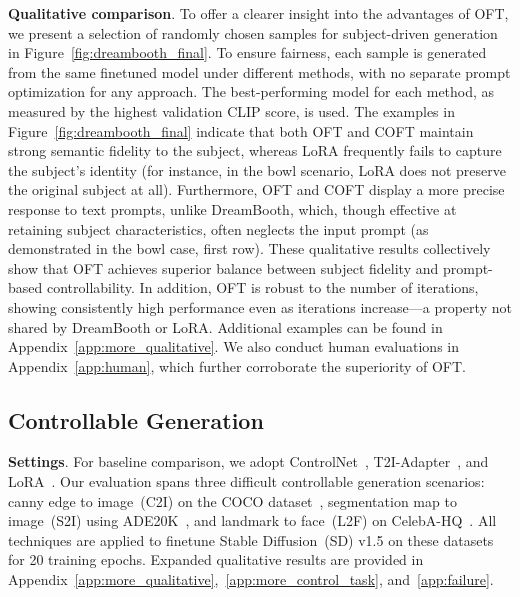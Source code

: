 \textbf{Qualitative comparison}. To offer a clearer insight into the advantages of OFT, we present a selection of randomly chosen samples for subject-driven generation in Figure~\ref{fig:dreambooth_final}. To ensure fairness, each sample is generated from the same finetuned model under different methods, with no separate prompt optimization for any approach. The best-performing model for each method, as measured by the highest validation CLIP score, is used. The examples in Figure~\ref{fig:dreambooth_final} indicate that both OFT and COFT maintain strong semantic fidelity to the subject, whereas LoRA frequently fails to capture the subject’s identity (for instance, in the bowl scenario, LoRA does not preserve the original subject at all). Furthermore, OFT and COFT display a more precise response to text prompts, unlike DreamBooth, which, though effective at retaining subject characteristics, often neglects the input prompt (as demonstrated in the bowl case, first row). These qualitative results collectively show that OFT achieves superior balance between subject fidelity and prompt-based controllability. In addition, OFT is robust to the number of iterations, showing consistently high performance even as iterations increase—a property not shared by DreamBooth or LoRA. Additional examples can be found in Appendix~\ref{app:more_qualitative}. We also conduct human evaluations in Appendix~\ref{app:human}, which further corroborate the superiority of OFT.

\subsection{Controllable Generation}

\textbf{Settings}. For baseline comparison, we adopt ControlNet~\cite{zhang2023adding}, T2I-Adapter~\cite{mou2023t2i}, and LoRA~\cite{hulora2022}. Our evaluation spans three difficult controllable generation scenarios: canny edge to image~(C2I) on the COCO dataset~\cite{lin2014microsoft}, segmentation map to image~(S2I) using ADE20K~\cite{zhou2017scene}, and landmark to face~(L2F) on CelebA-HQ~\cite{karras2018progressive,xia2021tedigan}. All techniques are applied to finetune Stable Diffusion~(SD) v1.5 on these datasets for 20 training epochs. Expanded qualitative results are provided in Appendix~\ref{app:more_qualitative},~\ref{app:more_control_task}, and~\ref{app:failure}.

